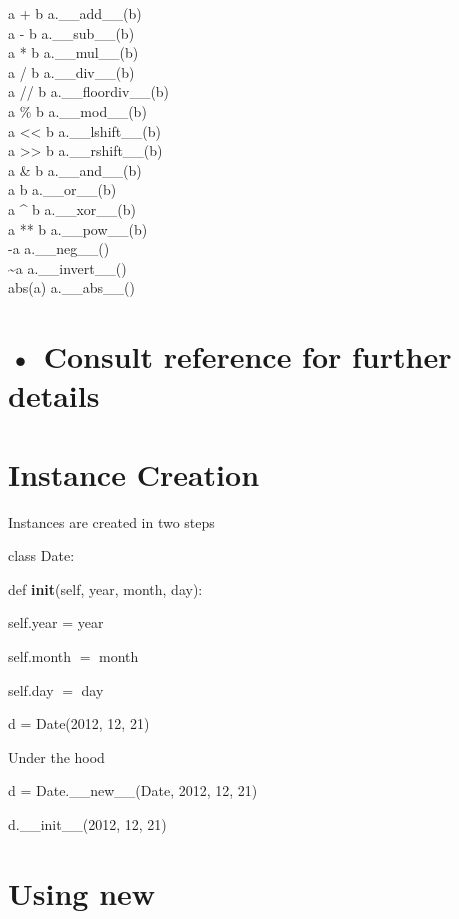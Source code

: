 \documentclass[
  letterpaper,
  DIV=11,
  numbers=noendperiod]{scrreprt}
\begin{document}
a + b a.\_\_add\_\_(b)\\
a - b a.\_\_sub\_\_(b)\\
a * b a.\_\_mul\_\_(b)\\
a / b a.\_\_div\_\_(b)\\
a // b a.\_\_floordiv\_\_(b)\\
a \% b a.\_\_mod\_\_(b)\\
a \textless\textless{} b a.\_\_lshift\_\_(b)\\
a \textgreater\textgreater{} b a.\_\_rshift\_\_(b)\\
a \& b a.\_\_and\_\_(b)\\
a \textbar{} b a.\_\_or\_\_(b)\\
a \^{} b a.\_\_xor\_\_(b)\\
a ** b a.\_\_pow\_\_(b)\\
-a a.\_\_neg\_\_()\\
\textasciitilde a a.\_\_invert\_\_()\\
abs(a) a.\_\_abs\_\_()


\chapter{• Consult reference for further
details}\label{consult-reference-for-further-details}


\chapter{Instance Creation}\label{instance-creation}

Instances are created in two steps

class Date:

def \textbf{init}(self, year, month, day):

self.year = year

self.month \(=\) month

self.day \(=\) day

d = Date(2012, 12, 21)

Under the hood

d = Date.\_\_new\_\_(Date, 2012, 12, 21)

d.\_\_init\_\_(2012, 12, 21)


\chapter{Using new}\label{using-new}
\end{document}
